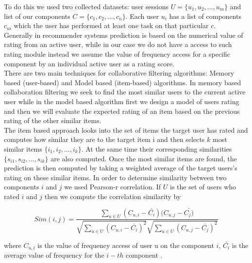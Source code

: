 To do this we used  two collected datasets: 
user sessions $U=\{u_1, u_2, ... , u_m\}$ and 
list of our components $C =\{c_1, c_2, ... , c_n\}$. Each user $u_i$ 
has a list of components $c_{ui}$ which the user
has performed at least one task on that particular $c$. \\
Generally in recommender systems prediction is based on the numerical value of 
rating from an active user, while in our case we do not have a access to such rating 
module instead we assume the value of frequency access for a specific component by 
an individual active user as a rating score. \\
There are two main techniques for collaborative filtering algorithms:
Memory based (user-based) and Model based (item-based) algorithms. 
In memory based collaboration filtering we seek to find the 
most similar users to the current active user while in the model based algorithm 
first we design a model of users rating and then we will evaluate 
the expected rating of an item based on the previous rating of the other similar items.\\  
The item based approach looks into the set of items the target user has rated and computes 
how similar they are to the target item i and then selects $k$ most similar items $\{i_1, i_2, ..., i_k\}$.
At the same time their corresponding similarities $\{s_{i1}, s_{i2}, ..., s_{ik}\}$ are also computed. 
Once the most similar items are found, the prediction is then computed by 
taking a weighted average of the target users's rating on these similar items. 
In order to determine similarity between two components $i$ and $j$ we used
Pearson-r correlation. 
If $U$ is the set of users who rated $i$ and $j$ then we compute the correlation similarity by


\[
{Sim (i,j) = \frac {\sum_{u\in {U}}(C_{u,i} - \bar{C_i})(C_{u,j} - \bar{C_j)}}
	{ \sqrt{\sum_{u\in {U}}({C_{u,i} - \bar{C_i}})^{2}}
	{ \sqrt{\sum_{u\in {U}}({C_{u,j} - \bar{C_j}})^{2}}}}}	
\]


where $C_{u,i}$ is the value of frequency access of user u on the component $i$, 
$\bar{C_i}$ is the average value of frequency for the $i-th$ component . 


